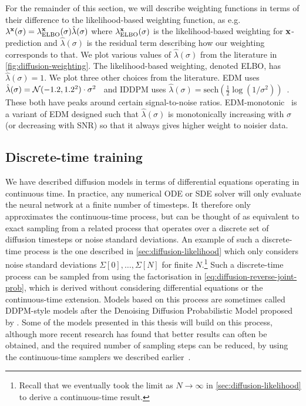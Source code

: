 For the remainder of this section, we will describe weighting functions in terms of their difference to the likelihood-based weighting function, as e.g. $\lambda^{\mathbf{x}}(\sigma) = \lambda^{\mathbf{x}}_\text{ELBO}(\sigma) \hat{\lambda}(\sigma)$ where $\lambda^{\mathbf{x}}_\text{ELBO}(\sigma)$ is the likelihood-based weighting for ${\mathbf{x}}$-prediction and $\hat{\lambda}(\sigma)$ is the residual term describing how our weighting corresponds to that. We plot various values of $\hat{\lambda}(\sigma)$ from the literature in \cref{fig:diffusion-weighting}. The likelihood-based weighting, denoted ELBO, has $\hat{\lambda}(\sigma) = 1$. We plot three other choices from the literature. EDM uses $\hat{\lambda}(\sigma) = {\mathcal{N}}(-1.2, 1.2^2) \cdot \sigma^2$~\citep{karras2022elucidating,kingma2023understanding} and IDDPM uses $\hat{\lambda}(\sigma) = \text{sech}(\frac{1}{2} \log(1/\sigma^2) )$~\citep{nichol2021improved,kingma2023understanding}. These both have peaks around certain signal-to-noise ratios. EDM-monotonic~\citep{kingma2023understanding} is a variant of EDM designed such that $\hat{\lambda}(\sigma)$ is monotonically increasing with $\sigma$ (or decreasing with SNR) so that it always gives higher weight to noisier data.


\subsection{Discrete-time training} \label{sec:diffusion-discrete-time}
We have described diffusion models in terms of differential equations operating in continuous time. In practice, any numerical ODE or SDE solver will only evaluate the neural network at a finite number of timesteps. It therefore only approximates the continuous-time process, but can be thought of as equivalent to exact sampling from a related process that operates over a discrete set of diffusion timesteps or noise standard deviations. An example of such a discrete-time process is the one described in \cref{sec:diffusion-likelihood} which only considers noise standard deviations $\Sigma[0], \ldots, \Sigma[N]$ for finite $N$.\footnote{Recall that we eventually took the limit as $N \rightarrow \infty$ in \cref{sec:diffusion-likelihood} to derive a continuous-time result.}
%
Such a discrete-time process can be sampled from using the factorisation in \cref{eq:diffusion-reverse-joint-prob}, which is derived without considering differential equations or the continuous-time extension.
%
Models based on this process are sometimes called DDPM-style models after the Denoising Diffusion Probabilistic Model proposed by \citet{ho2020denoising}. Some of the models presented in this thesis will build on this process, although more recent research has found that better results can often be obtained, and the required number of sampling steps can be reduced, by using the continuous-time samplers we described earlier~\citep{karras2022elucidating}. 

